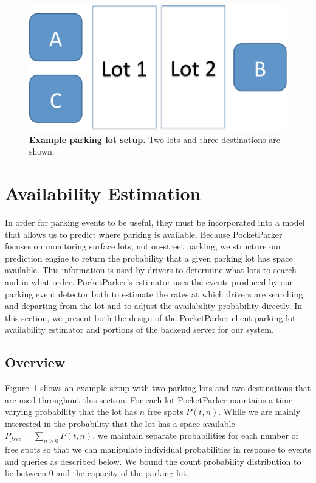 \begin{figure}
\centering
\includegraphics[width=0.6\columnwidth]{./figures/CartoonLot.pdf}

\caption{\textbf{Example parking lot setup.} Two lots and three
destinations are shown.}

\label{fig-lots}
\end{figure}

\section{Availability Estimation}

In order for parking events to be useful, they must be incorporated into a
model that allows us to predict where parking is available. Because
PocketParker focuses on monitoring surface lots, not on-street parking, we
structure our prediction engine to return the probability that a given
parking lot has space available. This information is used by drivers to
determine what lots to search and in what order. PocketParker's estimator
uses the events produced by our parking event detector both to estimate the
rates at which drivers are searching and departing from the lot and to adjust
the availability probability directly. In this section, we present both the
design of the PocketParker client parking lot availability estimator and
portions of the backend server for our system.

\subsection{Overview}

Figure~\ref{fig-lots} shows an example setup with two parking lots and two
destinations that are used throughout this section. For each lot PocketParker
maintains a time-varying probability that the lot has $n$ free spots $P(t,
n)$. While we are mainly interested in the probability that the lot has a
space available $P_{free} = \sum_{n > 0} P(t, n)$, we maintain separate
probabilities for each number of free spots so that we can manipulate
individual probabilities in response to events and queries as described
below. We bound the count probability distribution to lie between 0 and the
capacity of the parking lot. 

